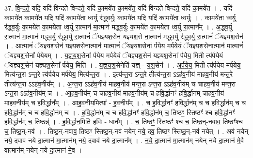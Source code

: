 \documentclass[17pt]{extarticle}
\begin{document}
37. वि॒न्द॒ते॒ यदि॒ यदि॑ विन्दते विन्दते॒ यदि॑ का॒मये॑त का॒मये॑त॒ यदि॑ विन्दते विन्दते॒ यदि॑ का॒मये॑त । . यदि॑ का॒मये॑त का॒मये॑त॒ यदि॒ यदि॑ का॒मये॑ता ध्व॒र्यु र॑द्ध्व॒र्युः का॒मये॑त॒ यदि॒ यदि॑ का॒मये॑ता ध्व॒र्युः । . का॒मये॑ता ध्व॒र्यु र॑द्ध्व॒र्युः का॒मये॑त का॒मये॑ता ध्व॒र्यु रा॒त्मान॑ मा॒त्मान॑ मद्ध्व॒र्युः का॒मये॑त का॒मये॑ता ध्व॒र्यु रा॒त्मान᳚म् । . अ॒द्ध्व॒र्यु रा॒त्मान॑ मा॒त्मान॑ मद्ध्व॒र्यु र॑द्ध्व॒र्यु रा॒त्मानं॑ ॅयज्ञ्यश॒सेन॑ यज्ञ्यश॒से ना॒त्मान॑ मद्ध्व॒र्यु र॑द्ध्व॒र्यु रा॒त्मानं॑ ॅयज्ञ्यश॒सेन॑ । . आ॒त्मानं॑ ॅयज्ञ्यश॒सेन॑ यज्ञ्यश॒सेना॒त्मान॑ मा॒त्मानं॑ ॅयज्ञ्यश॒सेना᳚ र्पयेय मर्पयेयं ॅयज्ञ्यश॒सेना॒त्मान॑ मा॒त्मानं॑ ॅयज्ञ्यश॒सेना᳚ र्पयेयम् । . य॒ज्ञ्॒य॒श॒सेना᳚ र्पयेय मर्पयेयं ॅयज्ञ्यश॒सेन॑ यज्ञ्यश॒सेना᳚ र्पयेय॒ मिती त्य॑र्पयेयं ॅयज्ञ्यश॒सेन॑ यज्ञ्यश॒सेना᳚ र्पयेय॒ मिति॑ । . य॒ज्ञ्॒य॒श॒सेनेति॑ यज्ञ् - य॒श॒सेन॑ । . अ॒र्प॒ये॒य॒ मिती त्य॑र्पयेय मर्पयेय॒ मित्य॑न्त॒रा ऽन्त॒रे त्य॑र्पयेय मर्पयेय॒ मित्य॑न्त॒रा । . इत्य॑न्त॒रा ऽन्त॒रे तीत्य॑न्त॒रा ऽऽह॑व॒नीय॑ माहव॒नीय॑ मन्त॒रे तीत्य॑न्त॒रा ऽऽह॑व॒नीय᳚म् । . अ॒न्त॒रा ऽऽह॑व॒नीय॑ माहव॒नीय॑ मन्त॒रा ऽन्त॒रा ऽऽह॑व॒नीय॑म् च चाहव॒नीय॑ मन्त॒रा ऽन्त॒रा ऽऽह॑व॒नीय॑म् च । . आ॒ह॒व॒नीय॑म् च चाहव॒नीय॑ माहव॒नीय॑म् च हवि॒र्द्धानꣳ॑ हवि॒र्द्धान॑म् चाहव॒नीय॑ माहव॒नीय॑म् च हवि॒र्द्धान᳚म् । . आ॒ह॒व॒नीय॒मित्या᳚ - ह॒व॒नीय᳚म् । . च॒ ह॒वि॒र्द्धानꣳ॑ हवि॒र्द्धान॑म् च च हवि॒र्द्धान॑म् च च हवि॒र्द्धान॑म् च च हवि॒र्द्धान॑म् च । . ह॒वि॒र्द्धान॑म् च च हवि॒र्द्धानꣳ॑ हवि॒र्द्धान॑म् च॒ तिष्ठꣳ॒॒ स्तिष्ठꣳ॑ श्च हवि॒र्द्धानꣳ॑ हवि॒र्द्धान॑म् च॒ तिष्ठन्न्॑ । . ह॒वि॒र्द्धान॒मिति॑ हविः - धान᳚म् । . च॒ तिष्ठꣳ॒॒ स्तिष्ठꣳ॑ श्च च॒ तिष्ठ॒न्-नवाव॒ तिष्ठꣳ॑श्च च॒ तिष्ठ॒न्-नव॑ । . तिष्ठ॒न्-नवाव॒ तिष्ठꣳ॒॒ स्तिष्ठ॒न्-नव॑ नयेन् नये॒ दव॒ तिष्ठꣳ॒॒ स्तिष्ठ॒न्-नव॑ नयेत् । . अव॑ नयेन् नये॒ दवाव॑ नये दा॒त्मान॑ मा॒त्मान॑म् नये॒ दवाव॑ नये दा॒त्मान᳚म् । . न॒ये॒ दा॒त्मान॑ मा॒त्मान॑म् नयेन् नये दा॒त्मान॑ मे॒वै वात्मान॑म् नयेन् नये दा॒त्मान॑ मे॒व । \newline
\pagebreak
{}
\end{document}
